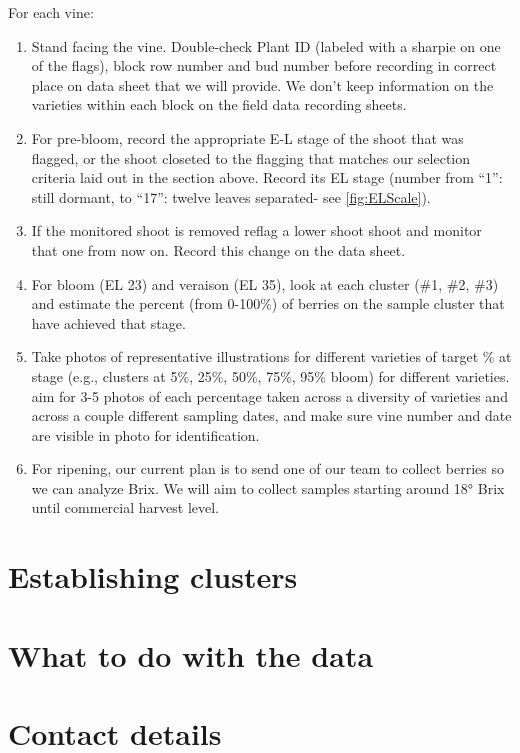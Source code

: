 \documentclass[11pt,letter]{article}
\begin{document}
For each vine:
\begin{enumerate}
	\item Stand facing the vine. Double-check Plant ID (labeled with a sharpie on one of the flags), block row number and bud number before recording in correct place on data sheet that we will provide. We don't keep information on the varieties within each block on the field data recording sheets.
	\item For pre-bloom, record the appropriate E-L stage of the shoot that was flagged, or the shoot closeted to the flagging that matches our selection criteria laid out in the section above. Record its EL stage (number from “1”: still dormant, to “17”: twelve leaves separated- see \ref{fig:ELScale}).
	\item If the monitored shoot is removed reflag a lower shoot shoot and monitor that one from now on. Record this change on the data sheet. 
	\item  For bloom (EL 23) and veraison (EL 35), look at each cluster (\#1, \#2, \#3) and estimate the percent (from 0-100\%) of berries on the sample cluster that have achieved that stage. 
	\item Take photos of representative illustrations for different varieties of target \% at stage (e.g., clusters at 5\%, 25\%, 50\%, 75\%, 95\% bloom) for different varieties. aim for 3-5 photos of each percentage taken across a diversity of varieties and across a couple different sampling dates, and make sure vine number and date are visible in photo for identification.
	\item For ripening, our current plan is to send one of our team to collect berries so we can analyze Brix. We will aim to collect samples starting around 18° Brix until commercial harvest level. 

\end{enumerate}



\section{Establishing clusters}

\section{What to do with the data}

\section{Contact details}
\end{document}
